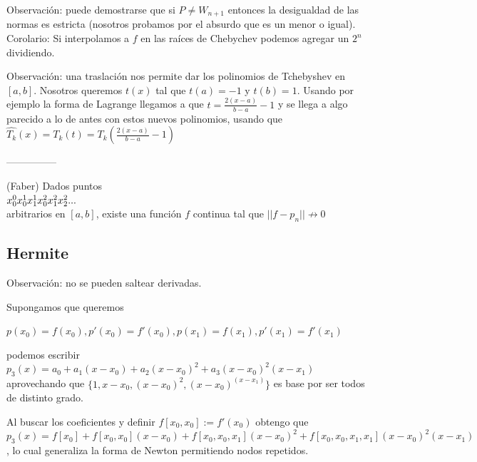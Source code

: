 \documentclass[10pt,a4paper,final]{report}
\begin{document}
Observación: puede demostrarse que si $P \neq W_{n+1}$ entonces la desigualdad de las normas es estricta (nosotros probamos por el absurdo que es un menor o igual).\\


Corolario: Si interpolamos a $f$ en las raíces de Chebychev podemos agregar un $2^n$ dividiendo.


Observación: una traslación nos permite dar los polinomios de Tchebyshev en $[a,b]$. Nosotros queremos $t(x)$ tal que $t(a) = -1$ y $t(b) =1$. Usando por ejemplo la forma de Lagrange llegamos a que $t = \frac{2(x-a)}{b-a} - 1$ y se llega a algo parecido a lo de antes con estos nuevos polinomios, usando que $\hat{T_k}(x)= T_k(t) = T_k(\frac{2(x-a)}{b-a} - 1)$

---------------

\begin{theorem} (Faber) Dados puntos\\

$\\
x_0^0\\
x_0^1 x_1^1\\
x_0^2 x_1^2 x_2^2\\
...\\
$\\
arbitrarios en $[a,b]$, existe una función $f$ continua tal que $||f-p_n|| \not\to 0$
\end{theorem}

\subsection{Hermite}

Observación: no se pueden saltear derivadas.

Supongamos que queremos


$p(x_0)=f(x_0), p'(x_0) = f'(x_0), p(x_1) = f(x_1), p'(x_1) = f'(x_1)$

podemos escribir $p_3(x)= a_0 + a_1 (x-x_0) + a_2 (x-x_0)^2 + a_3 (x-x_0)^2 (x-x_1)$ aprovechando que $\{1,x-x_0,(x-x_0)^2, (x-x_0)^ (x-x_1)\}$ es base por ser todos de distinto grado.

Al buscar los coeficientes y definir $f[x_0,x_0] :=f'(x_0)$ obtengo que $p_3(x)= f[x_0] + f[x_0,x_0] (x-x_0) + f[x_0,x_0,x_1] (x-x_0)^2 + f[x_0,x_0,x_1,x_1] (x-x_0)^2 (x-x_1)$, lo cual generaliza la forma de Newton permitiendo nodos repetidos.
\end{document}
